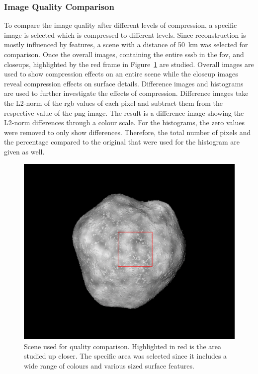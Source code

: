 \subsubsection{Image Quality Comparison} \label{sec:img_quali_comp}
To compare the image quality after different levels of compression, a specific image is selected which is compressed to different levels. Since reconstruction is mostly influenced by features, a scene with a distance of \SI{50}{\kilo\meter} was selected for comparison. Once the overall images, containing the entire \gls{sssb} in the \gls{fov}, and closeups, highlighted by the red frame in Figure~\ref{fig:img_quality_frame} are studied. Overall images are used to show compression effects on an entire scene while the closeup images reveal compression effects on surface details. Difference images and histograms are used to further investigate the effects of compression. Difference images take the L2-norm of the \gls{rgb} values of each pixel and subtract them from the respective value of the \gls{png} image. The result is a difference image showing the L2-norm differences through a colour scale. For the histograms, the zero values were removed to only show differences. Therefore, the total number of pixels and the percentage compared to the original that were used for the histogram are given as well.

\begin{figure}[htb]
    \centering
    \includegraphics[width=.7\textwidth]{doc/thesis/0_figures/compare_quality/set1/jp2_1000_frame.png}
    \caption{Scene used for quality comparison. Highlighted in red is the area studied up closer. The specific area was selected since it includes a wide range of colours and various sized surface features.}
    \label{fig:img_quality_frame}
\end{figure}


